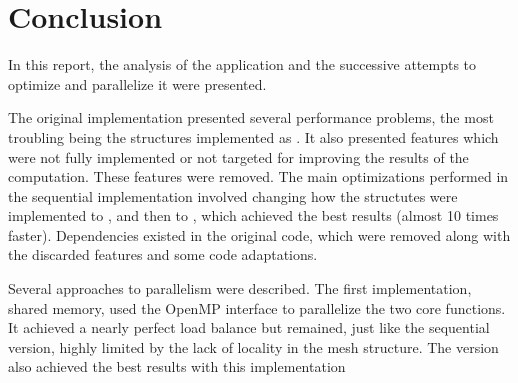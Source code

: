 \section{Conclusion}
\label{sec:conclusion}


In this report, the analysis of the \polu application and the successive attempts to optimize and parallelize it were presented.

The original implementation presented several performance problems, the most troubling being the structures implemented as \aop. It also presented features which were not fully implemented or not targeted for improving the results of the computation. These features were removed. The main optimizations performed in the sequential implementation involved changing how the structutes were implemented to \aos, and then to \soa, which achieved the best results (almost 10 times faster).
Dependencies existed in the original code, which were removed along with the discarded features and some code adaptations.

Several approaches to parallelism were described. The first implementation, shared memory, used the OpenMP interface to parallelize the two core functions. It achieved a nearly perfect load balance but remained, just like the sequential version, highly limited by the lack of locality in the mesh structure. The \soa version also achieved the best results with this implementation

